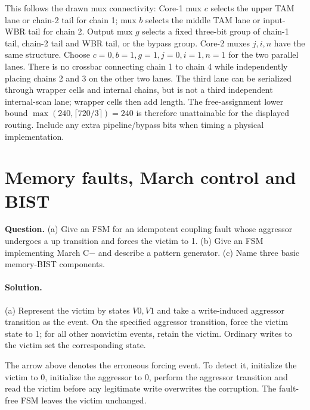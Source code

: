 \documentclass[11pt]{article}
\newcommand{\sol}{\paragraph{Solution.}}
\begin{document}
This follows the drawn mux connectivity: Core-1 mux $c$ selects the upper
TAM lane or chain-2 tail for chain 1; mux $b$ selects the middle TAM lane
or input-WBR tail for chain 2. Output mux $g$ selects a fixed three-bit group
of chain-1 tail, chain-2 tail and WBR tail, or the bypass group.
Core-2 muxes $j,i,n$ have the same structure.
Choose $c=0,b=1,g=1,j=0,i=1,n=1$ for the two parallel lanes.
There is no crossbar connecting chain 1 to chain 4 while independently placing
chains 2 and 3 on the other two lanes. The third lane can be serialized through
wrapper cells and internal chains, but is not a third independent internal-scan
lane; wrapper cells then add length.
The free-assignment lower bound $\max(240,\lceil720/3\rceil)=240$ is therefore
unattainable for the displayed routing. Include any extra pipeline/bypass bits
when timing a physical implementation.

\section{Memory faults, March control and BIST}
\textbf{Question.} (a) Give an FSM for an idempotent coupling fault
whose aggressor undergoes a up transition and forces the victim to 1.
(b) Give an FSM implementing March C$-$ and describe a pattern generator.
(c) Name three basic memory-BIST components.

\sol (a) Represent the victim by states $V0,V1$ and take a write-induced
aggressor transition as the event. On the specified aggressor transition, force
the victim state to 1; for all other nonvictim events, retain the victim.
Ordinary writes to the victim set the corresponding state.
\begin{center}\end{center}

The arrow above denotes the erroneous forcing event.
To detect it, initialize the victim to 0,
initialize the aggressor to 0,
perform the aggressor transition and read the victim before any legitimate
write overwrites the corruption. The fault-free FSM leaves the victim unchanged.
\end{document}
